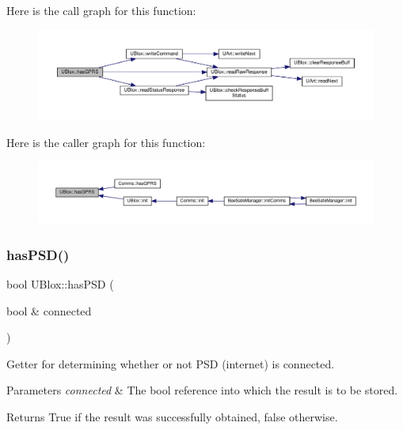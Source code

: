 Here is the call graph for this function\+:\nopagebreak
\begin{figure}[H]
\begin{center}
\leavevmode
\includegraphics[width=350pt]{da/df6/class_u_blox_a4f5a31b4ddda664b255ce3f63e9ffac7_cgraph}
\end{center}
\end{figure}
Here is the caller graph for this function\+:\nopagebreak
\begin{figure}[H]
\begin{center}
\leavevmode
\includegraphics[width=350pt]{da/df6/class_u_blox_a4f5a31b4ddda664b255ce3f63e9ffac7_icgraph}
\end{center}
\end{figure}
\mbox{\label{class_u_blox_ae49b51a602a327b5eff5b04d2ccaec20}} 
\subsubsection{\texorpdfstring{has\+P\+S\+D()}{hasPSD()}}
{\footnotesize\ttfamily bool U\+Blox\+::has\+P\+SD (\begin{DoxyParamCaption}\item[{bool \&}]{connected }\end{DoxyParamCaption})}

Getter for determining whether or not P\+SD (internet) is connected.


\begin{DoxyParams}{Parameters}
{\em connected} & The bool reference into which the result is to be stored. \\
\hline
\end{DoxyParams}
\begin{DoxyReturn}{Returns}
True if the result was successfully obtained, false otherwise. 
\end{DoxyReturn}


